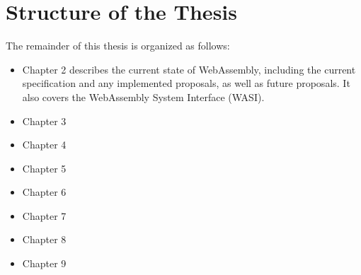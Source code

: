 \section{Structure of the Thesis}
\label{sec:structure-of-the-thesis}

The remainder of this thesis is organized as follows:
\begin{itemize}
  \item Chapter 2 describes the current state of WebAssembly, including the current specification and any implemented proposals, as well as future proposals. It also covers the WebAssembly System Interface (WASI).
  \item Chapter 3
  \item Chapter 4
  \item Chapter 5
  \item Chapter 6
  \item Chapter 7
  \item Chapter 8
  \item Chapter 9
\end{itemize}
